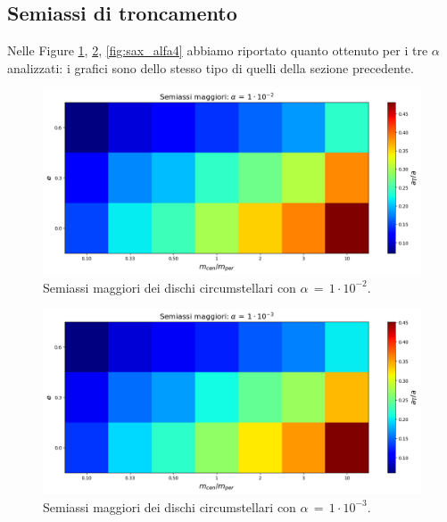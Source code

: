 \newpage

\subsection{Semiassi di troncamento} \label{subsec:semiax_tr}

Nelle Figure \ref{fig:sax_alfa2}, \ref{fig:sax_alfa3}, \ref{fig:sax_alfa4} abbiamo riportato quanto ottenuto per i tre $\alpha$ analizzati: i grafici sono dello stesso tipo di quelli della sezione precedente.

\begin{figure}[H]
  \centering
  \includegraphics[width=\textwidth]{Immagini/Risultati/semiassi_alfa2.png}
  \caption{Semiassi maggiori dei dischi circumstellari con $\alpha\,=\,1 \cdot 10^{-2}$. }
  \label{fig:sax_alfa2}
\end{figure}

\begin{figure}[H]
  \centering
  \includegraphics[width=\textwidth]{Immagini/Risultati/semiassi_alfa3.png}
  \caption{Semiassi maggiori dei dischi circumstellari con $\alpha\,=\,1 \cdot 10^{-3}$. }
  \label{fig:sax_alfa3}
\end{figure}


